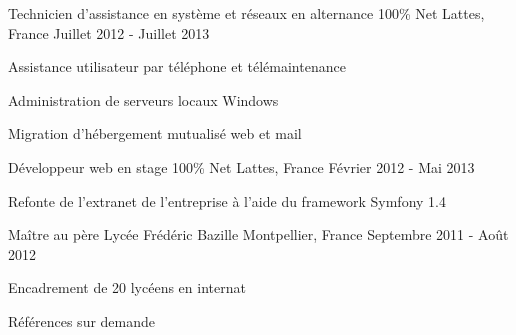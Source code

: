 \begin{cventries}
  \cventry
    {Technicien d'assistance en système et réseaux en alternance} %
    {100\% Net} %
    {Lattes, France} %
    {Juillet 2012 - Juillet 2013} %
    {
      \begin{cvitems} %
        \item {Assistance utilisateur par téléphone et télémaintenance}
        \item {Administration de serveurs locaux Windows}
        \item {Migration d'hébergement mutualisé web et mail}
      \end{cvitems}
    }

  \cventry
    {Développeur web en stage} %
    {100\% Net} %
    {Lattes, France} %
    {Février 2012 - Mai 2013} %
    {
      \begin{cvitems} %
        \item {Refonte de l'extranet de l'entreprise à l'aide du framework Symfony 1.4}
      \end{cvitems}
    }

  \cventry
    {Maître au père} %
    {Lycée Frédéric Bazille} %
    {Montpellier, France} %
    {Septembre 2011 - Août 2012} %
    {
      \begin{cvitems} %
        \item {Encadrement de 20 lycéens en internat}
      \end{cvitems}
    }

  \cventry
  {} %
  {} %
  {} %
  {} %
  {Références sur demande}

\end{cventries}

